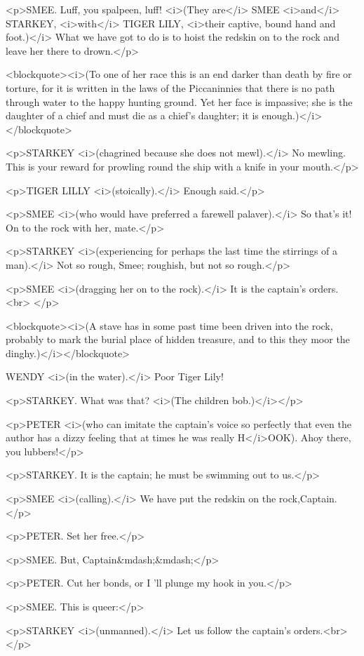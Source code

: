 <p>SMEE. Luff, you spalpeen, luff! <i>(They are</i> SMEE <i>and</i>
STARKEY, <i>with</i> TIGER LILY, <i>their captive, bound hand and
foot.)</i> What we have got to do is to hoist the redskin on to the
rock and leave her there to drown.</p>

<blockquote><i>(To one of her race this is an end darker than death
by fire or torture, for it is written in the laws of the Piccaninnies
that there is no path through water to the happy hunting ground. Yet
her face is impassive; she is the daughter of a chief and must die as
a chief's daughter; it is enough.)</i></blockquote>

<p>STARKEY <i>(chagrined because she does not mewl).</i> No mewling.
This is your reward for prowling round the ship with a knife in your
mouth.</p>

<p>TIGER LILLY <i>(stoically).</i> Enough said.</p>

<p>SMEE <i>(who would have preferred a farewell palaver).</i> So
that's it! On to the rock with her, mate.</p>

<p>STARKEY <i>(experiencing for perhaps the last time the stirrings
of a man).</i> Not so rough, Smee; roughish, but not so rough.</p>

<p>SMEE <i>(dragging her on to the rock).</i> It is the captain's
orders.<br>
</p>

<blockquote><i>(A stave has in some past time been driven into the
rock, probably to mark the burial place of hidden treasure, and to
this they moor the dinghy.)</i></blockquote>

WENDY <i>(in the water).</i> Poor Tiger Lily! 

<p>STARKEY. What was that? <i>(The children bob.)</i></p>

<p>PETER <i>(who can imitate the captain's voice so perfectly that
even the author has a dizzy feeling that at times he was really
H</i>OOK). Ahoy there, you lubbers!</p>

<p>STARKEY. It is the captain; he must be swimming out to us.</p>

<p>SMEE <i>(calling).</i> We have put the redskin on the
rock,Captain.</p>

<p>PETER. Set her free.</p>

<p>SMEE. But, Captain&mdash;&mdash;</p>

<p>PETER. Cut her bonds, or I 'll plunge my hook in you.</p>

<p>SMEE. This is queer:</p>

<p>STARKEY <i>(unmanned).</i> Let us follow the captain's orders.<br>
</p>

